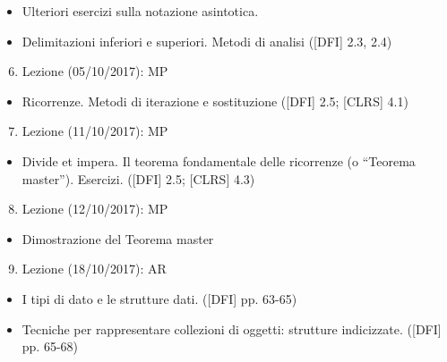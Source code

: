 \documentclass{article}
\providecommand{\tightlist}{%
  \setlength{\itemsep}{0pt}\setlength{\parskip}{0pt}}
\begin{document}
\begin{itemize}
\tightlist
\item
  {Ulteriori esercizi sulla notazione asintotica.}
\item
  {Delimitazioni inferiori e superiori. Metodi di analisi ({[}DFI{]}
  2.3, 2.4)}
\end{itemize}

\begin{enumerate}
\setcounter{enumi}{5}
\tightlist
\item
  {Lezione (05/10/2017): MP}
\end{enumerate}

\begin{itemize}
\tightlist
\item
  {Ricorrenze. Metodi di iterazione e sostituzione ({[}DFI{]} 2.5;
  {[}CLRS{]} 4.1)}
\end{itemize}

\begin{enumerate}
\setcounter{enumi}{6}
\tightlist
\item
  {Lezione (11/10/2017): MP}
\end{enumerate}

\begin{itemize}
\tightlist
\item
  {Divide et impera. Il teorema fondamentale delle ricorrenze (o
  ``Teorema master''). Esercizi. ({[}DFI{]} 2.5; {[}CLRS{]} 4.3)}
\end{itemize}

\begin{enumerate}
\setcounter{enumi}{7}
\tightlist
\item
  {Lezione (12/10/2017): MP}
\end{enumerate}

\begin{itemize}
\tightlist
\item
  {Dimostrazione del Teorema master}
\end{itemize}

\begin{enumerate}
\setcounter{enumi}{8}
\tightlist
\item
  {Lezione (18/10/2017): AR}
\end{enumerate}

\begin{itemize}
\tightlist
\item
  {I tipi di dato e le strutture dati. ({[}DFI{]} pp. 63-65)}
\item
  {Tecniche per rappresentare collezioni di oggetti: strutture
  indicizzate. ({[}DFI{]} pp. 65-68)}
\end{itemize}
\end{document}
